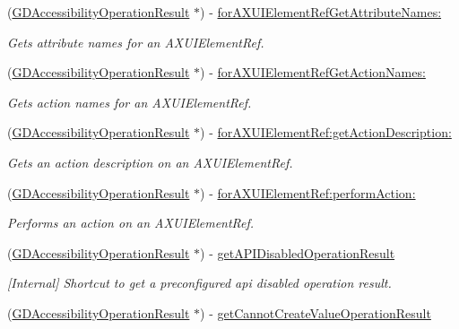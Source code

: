 \begin{DoxyCompactItemize}
(\hyperlink{interface_g_d_accessibility_operation_result}{GDAccessibilityOperationResult} $\ast$) -\/ \hyperlink{interface_g_d_accessibility_manager_a25f20499558c7b5bbd4fccca578fbefe}{forAXUIElementRefGetAttributeNames:}
\begin{DoxyCompactList}\small\item\em Gets attribute names for an AXUIElementRef. \item\end{DoxyCompactList}\item 
(\hyperlink{interface_g_d_accessibility_operation_result}{GDAccessibilityOperationResult} $\ast$) -\/ \hyperlink{interface_g_d_accessibility_manager_af7ed61beb0c1683b0e8a766ecd977547}{forAXUIElementRefGetActionNames:}
\begin{DoxyCompactList}\small\item\em Gets action names for an AXUIElementRef. \item\end{DoxyCompactList}\item 
(\hyperlink{interface_g_d_accessibility_operation_result}{GDAccessibilityOperationResult} $\ast$) -\/ \hyperlink{interface_g_d_accessibility_manager_aec013555193c1fade98e5ae3e36f953b}{forAXUIElementRef:getActionDescription:}
\begin{DoxyCompactList}\small\item\em Gets an action description on an AXUIElementRef. \item\end{DoxyCompactList}\item 
(\hyperlink{interface_g_d_accessibility_operation_result}{GDAccessibilityOperationResult} $\ast$) -\/ \hyperlink{interface_g_d_accessibility_manager_a365dbd94f222b04c86141c83c1542e68}{forAXUIElementRef:performAction:}
\begin{DoxyCompactList}\small\item\em Performs an action on an AXUIElementRef. \item\end{DoxyCompactList}\item 
\hypertarget{interface_g_d_accessibility_manager_aef4b860ce6e68e077e52fa67c7226a44}{
(\hyperlink{interface_g_d_accessibility_operation_result}{GDAccessibilityOperationResult} $\ast$) -\/ \hyperlink{interface_g_d_accessibility_manager_aef4b860ce6e68e077e52fa67c7226a44}{getAPIDisabledOperationResult}}
\label{interface_g_d_accessibility_manager_aef4b860ce6e68e077e52fa67c7226a44}

\begin{DoxyCompactList}\small\item\em \mbox{[}Internal\mbox{]} Shortcut to get a preconfigured api disabled operation result. \item\end{DoxyCompactList}\item 
\hypertarget{interface_g_d_accessibility_manager_a22c8eae92829ccbc2baa3a8d7721e466}{
(\hyperlink{interface_g_d_accessibility_operation_result}{GDAccessibilityOperationResult} $\ast$) -\/ \hyperlink{interface_g_d_accessibility_manager_a22c8eae92829ccbc2baa3a8d7721e466}{getCannotCreateValueOperationResult}}
\label{interface_g_d_accessibility_manager_a22c8eae92829ccbc2baa3a8d7721e466}


\end{DoxyCompactItemize}

